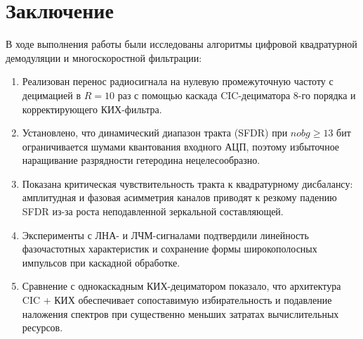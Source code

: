 \section*{Заключение}

В ходе выполнения работы были исследованы алгоритмы цифровой квадратурной демодуляции и многоскоростной фильтрации:
\begin{enumerate}
    \item Реализован перенос радиосигнала на нулевую промежуточную частоту с децимацией в $R=10$ раз с помощью каскада CIC-дециматора 8-го порядка и корректирующего КИХ-фильтра.
    \item Установлено, что динамический диапазон тракта (SFDR) при $nobg \ge 13$ бит ограничивается шумами квантования входного АЦП, поэтому избыточное наращивание разрядности гетеродина нецелесообразно.
    \item Показана критическая чувствительность тракта к квадратурному дисбалансу: амплитудная и фазовая асимметрия каналов приводят к резкому падению SFDR из-за роста неподавленной зеркальной составляющей.
    \item Эксперименты с ЛНА- и ЛЧМ-сигналами подтвердили линейность фазочастотных характеристик и сохранение формы широкополосных импульсов при каскадной обработке.
    \item Сравнение с однокаскадным КИХ-дециматором показало, что архитектура CIC + КИХ обеспечивает сопоставимую избирательность и подавление наложения спектров при существенно меньших затратах вычислительных ресурсов.
\end{enumerate}
